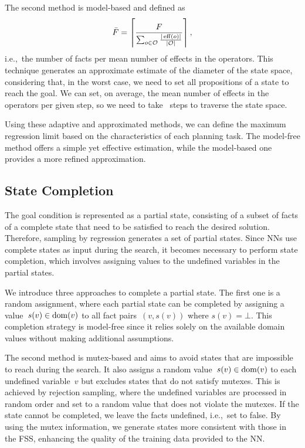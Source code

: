 The second method is model-based and defined as~$$\bar F=\left\lceil \frac{F}{\sum_{o\in \mathcal{O}} \frac{|\operatorname{eff}(o)|}{|\mathcal{O}|}}\right\rceil,$$ i.e.,~the number of facts per mean number of effects in the operators. This technique generates an approximate estimate of the diameter of the state space, considering that, in the worst case, we need to set all propositions of a state to reach the goal. We can set, on average, the mean number of effects in the operators per given step, so we need to take \meanfx~steps to traverse the state space.

Using these adaptive and approximated methods, we can define the maximum regression limit based on the characteristics of each planning task. The model-free method offers a simple yet effective estimation, while the model-based one provides a more refined approximation.

\subsection{State Completion}
\label{sec:state-completion}

The goal condition is represented as a partial state, consisting of a subset of facts of a complete state that need to be satisfied to reach the desired solution. Therefore, sampling by regression generates a set of partial states. Since NNs use complete states as input during the search, it becomes necessary to perform state completion, which involves assigning values to the undefined variables in the partial states.

We introduce three approaches to complete a partial state. The first one is a random assignment, where each partial state can be completed by assigning a value~$s(v) \in \operatorname{dom}(v)$ to all fact pairs~$(v,s(v))$ where $s(v)=\bot$. This completion strategy is model-free since it relies solely on the available domain values without making additional assumptions.

The second method is mutex-based and aims to avoid states that are impossible to reach during the search. It also assigns a random value~$s(v) \in \operatorname{dom}(v)$ to each undefined variable~$v$ but excludes states that do not satisfy mutexes. This is achieved by rejection sampling, where the undefined variables are processed in random order and set to a random value that does not violate the mutexes. If the state cannot be completed, we leave the facts undefined, i.e.,~set to false. By using the mutex information, we generate states more consistent with those in the FSS, enhancing the quality of the training data provided to the NN.

